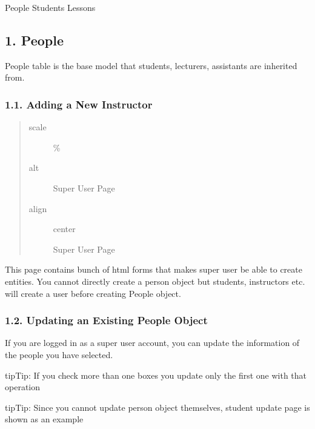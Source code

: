 \documentclass[letterpaper,10pt,english]{sphinxmanual}
\begin{document}
People
Students
Lessons


\subsection{1. People}
\label{\detokenize{user/mehmet:people}}
People table is the base model that students, lecturers, assistants are inherited from.


\subsubsection{1.1. Adding a New Instructor}
\label{\detokenize{user/mehmet:adding-a-new-instructor}}
\begin{figure}[htbp]
\centering

\noindent{}
\end{figure}
\begin{quote}\begin{description}
\item[{scale}]  \%

\item[{alt}] \leavevmode
Super User Page

\item[{align}] \leavevmode
center

Super User Page

\end{description}\end{quote}

This page contains bunch of html forms that makes super user be able to create entities. You cannot directly create a person object but students, instructors etc. will create a user before creating People object.


\subsubsection{1.2. Updating an Existing People Object}
\label{\detokenize{user/mehmet:updating-an-existing-people-object}}
If you are logged in as a super user account, you can update the information of the people you have selected.

\begin{sphinxadmonition}{tip}{Tip:}
If you check more than one boxes you update only the first one with that operation
\end{sphinxadmonition}

\begin{sphinxadmonition}{tip}{Tip:}
Since you cannot update person object themselves, student update page is shown as an example
\end{sphinxadmonition}
\end{document}
